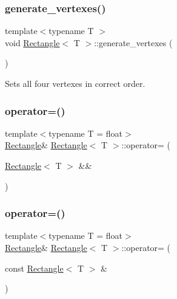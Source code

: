 \subsubsection{\texorpdfstring{generate\+\_\+vertexes()}{generate\_vertexes()}}
{\footnotesize\ttfamily template$<$typename T $>$ \\
void \mbox{\hyperlink{classRectangle}{Rectangle}}$<$ T $>$\+::generate\+\_\+vertexes (\begin{DoxyParamCaption}{ }\end{DoxyParamCaption})\hspace{0.3cm}{\ttfamily [private]}}



Sets all four vertexes in correct order. 

\mbox{\label{classRectangle_ab53b617f14505834f525ec614ccce5c8}} 
\subsubsection{\texorpdfstring{operator=()}{operator=()}\hspace{0.1cm}{\footnotesize\ttfamily [1/2]}}
{\footnotesize\ttfamily template$<$typename T  = float$>$ \\
\mbox{\hyperlink{classRectangle}{Rectangle}}\& \mbox{\hyperlink{classRectangle}{Rectangle}}$<$ T $>$\+::operator= (\begin{DoxyParamCaption}\item[{\mbox{\hyperlink{classRectangle}{Rectangle}}$<$ T $>$ \&\&}]{ }\end{DoxyParamCaption})\hspace{0.3cm}{\ttfamily [default]}}

\mbox{\label{classRectangle_ad0a038c8959e5bde09bf1e8f49980bea}} 
\subsubsection{\texorpdfstring{operator=()}{operator=()}\hspace{0.1cm}{\footnotesize\ttfamily [2/2]}}
{\footnotesize\ttfamily template$<$typename T  = float$>$ \\
\mbox{\hyperlink{classRectangle}{Rectangle}}\& \mbox{\hyperlink{classRectangle}{Rectangle}}$<$ T $>$\+::operator= (\begin{DoxyParamCaption}\item[{const \mbox{\hyperlink{classRectangle}{Rectangle}}$<$ T $>$ \&}]{ }\end{DoxyParamCaption})\hspace{0.3cm}{\ttfamily [default]}}

